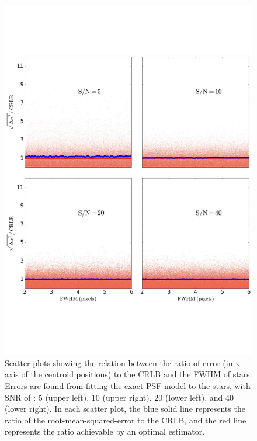 \documentclass[onecolumn]{aastex61}
\newcommand{\todo}[1]{{\textcolor{dred}{ #1}}}
\begin{document}

\begin{figure}[p]~\\
\begin{center}
\includegraphics[width=0.65\linewidth]{new_fwhm_psf.pdf}
\caption{\todo{Scatter plots showing the relation between the ratio of error (in x-axis of the centroid positions) to the CRLB and the FWHM of stars.
Errors are found from fitting the exact PSF model to the stars, with SNR  of : 5 (upper left), 10 (upper right), 20 (lower left), and 40 (lower right). In each scatter plot, the blue solid line represents the ratio of the root-mean-squared-error to the CRLB, and the red line represents the ratio achievable by an optimal estimator.}}\label{5}
\end{center}
\end{figure}
\end{document}
